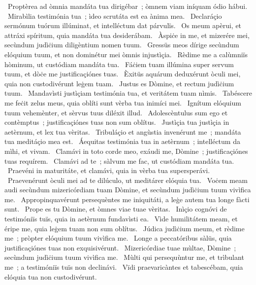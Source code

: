 ~Proptèrea ad òmnia mandáta tua dirigébar~; òmnem viam iníquam ódio hábui. 
~Mirabìlia testimónia tua~; ìdeo scrutáta est ea ànima mea. 
~Declaráçio sermónum tuórum illúminat, et intelléctum dat párvulïs. 
~Os meum apèrui, et attráxi spíritum, quia mandáta tua desiderábam. 
~Àspiċe in me, et mizerére mei, secùndum judìċium diligèntium nomen tuum. 
~Gressüs meos dírige secùndum elóquium tuum, et non dominétur mei òmnis injustìçia. 
~Rèdime me a calùmniïs hòminum, ut custódiam mandáta tua. 
~Fáċiem tuam illúmina super servum tuum, et dòċe me justificaçiónes tuas. 
~Èxitüs aquárum deduxérunt òculi mei, quia non custodivérunt leġem tuam. 
~Justus es Dòmine, et rectum judìċium tuum. 
~Mandavìsti justìçiam testimónia tua, et veritátem tuam nìmis. 
~Tabéscere me feċit zelus meus, quia oblíti sunt vèrba tua inimíci mei. 
~Ignítum elóquium tuum vehemènter, et sèrvus tuus diléxit illud. 
~Adolescèntulus sum ego et contèmptus~; justificaçiónes tuas non sum oblítus. 
~Justìçia tua justìçia in aetèrnum, et lex tua vèritas. 
~Tribuláçio et angùstia invenérunt me~; mandáta tua meditáçio mea est. 
~Áequitas testimónia tua in aetèrnum~; intelléctum da mìhi, et vivam. 
~Clamávi in toto corde meo, exáudi me, Dòmine~; justificaçiónes tuas requírem. 
~Clamávi ad te~; sàlvum me fac, ut custódiam mandáta tua. 
~Praevéni in maturitáte, et clamávi, quia in vèrba tua supersperávi. 
~Praevenérunt òculi mei ad te dilúculo, ut meditárer elóquia tua. 
~Voċem meam audi secùndum mizericórdiam tuam Dòmine, et secùndum judìċium tuum vivìfica me. 
~Appropinquavérunt persequèntes me iniquitáti, a leġe autem tua longe fàcti sunt. 
~Prope es tu Dòmine, et òmnes viae tuae vèritas. 
~Inìçio cognóvi de testimóniïs tuïs, quia in aetèrnum fundavìsti ea. 
~Vìde humilitátem meam, et éripe me, quia leġem tuam non sum oblítus. 
~Júdica judìċium meum, et rèdime me~; pròpter elóquium tuum vivìfica me. 
~Longe a peccatóribus sàlüs, quia justificaçiónes tuas non exquisivérunt. 
~Mizericórdiae tuae mùltae, Dòmine~; secùndum judìċium tuum vivìfica me. 
~Mùlti qui persequùntur me, et trìbulant me~; a testimóniïs tuïs non declinávi. 
~Vïdi praevaricàntes et tabescébam, quia elóquia tua non custodivérunt. 
